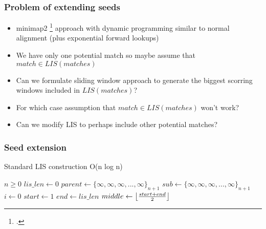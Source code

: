 \documentclass{beamer}
\begin{document}
\begin{frame}
  \frametitle{Problem of extending seeds}

  \begin{itemize}
    \item minimap2 \footcite{minimap2} approach with dynamic programming similar to normal alignment (plus exponential forward lookups)
    \item We have only one potential match so maybe assume that $match \in LIS(matches)$
    \item Can we formulate sliding window approach to generate the biggest scorring windows included in $LIS(matches)$?
    \item For which case assumption that $match \in LIS(matches)$ won't work?
    \item Can we modify LIS to perhaps include other potential matches?
  \end{itemize}
\end{frame}

\begin{frame}
  \frametitle{Seed extension}
  
  \begin{algorithm}[H]
      \captionsetup{font=scriptsize}
      \caption{Standard LIS construction O(n log n)}\label{alg:cap}
      \scriptsize
      \begin{algorithmic}
          \Require $n \geq 0$
          \State $lis\_len \gets 0$ 
          \State $parent \gets \{\infty, \infty, \infty, ..., \infty\}_{n+1}$ 
          \State $sub \gets \{\infty, \infty, \infty, ..., \infty\}_{n+1}$ 
          \State $i \gets 0$
           
              \State $start \gets 1$
              \State $end \gets lis\_len$
               
                  \State $middle \gets \floor*{\frac{start + end}{2}}$
                  \Else
                  \EndIf
              \EndWhile
               
              \EndIf
          \EndWhile
      \end{algorithmic}
  \end{algorithm}
\end{frame}
\end{document}
